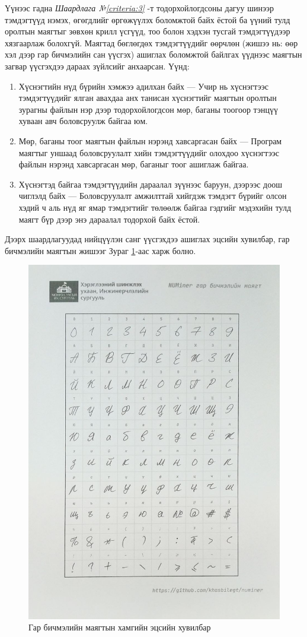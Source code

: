 Үүнээс гадна \textit{Шаардлага №\ref{criteria:3}} -т тодорхойлогдсоны дагуу шинээр тэмдэгтүүд нэмэх, өгөгдлийг өргөжүүлэх боломжтой байх ёстой ба үүний тулд оролтын маягтыг зөвхөн крилл үсгүүд, тоо болон хэдхэн тусгай тэмдэгтүүдээр хязгаарлаж болохгүй. Маягтад бөглөгдөх тэмдэгтүүдийг өөрчлөн (жишээ нь: өөр хэл дээр гар бичмэлийн сан үүсгэх) ашиглах боломжтой байлгах үүднээс маягтын загвар үүсгэхдээ дараах зүйлсийг анхаарсан. Үүнд:

\begin{enumerate}
	\item Хүснэгтийн нүд бүрийн хэмжээ адилхан байх --- Учир нь хүснэгтээс тэмдэгтүүдийг ялган авахдаа анх танисан хүснэгтийг маягтын оролтын зурагны файлын нэр дээр тодорхойлогдсон мөр, баганы тоогоор тэнцүү хуваан авч боловсруулж байгаа юм.
	\item Мөр, баганы тоог маягтын файлын нэрэнд хавсаргасан байх --- Програм маягтыг уншаад боловсруулалт хийн тэмдэгтүүдийг олохдоо хүснэгтээс файлын нэрэнд хавсаргасан мөр, баганыг тоог ашиглаж байгаа.
	\item Хүснэгтэд байгаа тэмдэгтүүдийн дараалал зүүнээс баруун, дээрээс доош чиглэлд байх --- Боловсруулалт амжилттай хийгдэж тэмдэгт бүрийг олсон хэдий ч аль нүд яг ямар тэмдэгтийг төлөөлж байгаа гэдгийг мэдэхийн тулд маягт бүр дээр энэ дараалал тодорхой байх ёстой.
\end{enumerate}

Дээрх шаардлагуудад нийцүүлэн санг үүсгэхдээ ашиглах эцсийн хувилбар, гар бичмэлийн маягтын жишээг Зураг \ref{fig:sheet_final}-аас харж болно.

\begin{figure}
	\centering
	\includegraphics[width=0.6\linewidth]{images/sheet_final}
	\caption{Гар бичмэлийн маягтын хамгийн эцсийн хувилбар}
	\label{fig:sheet_final}
\end{figure}

